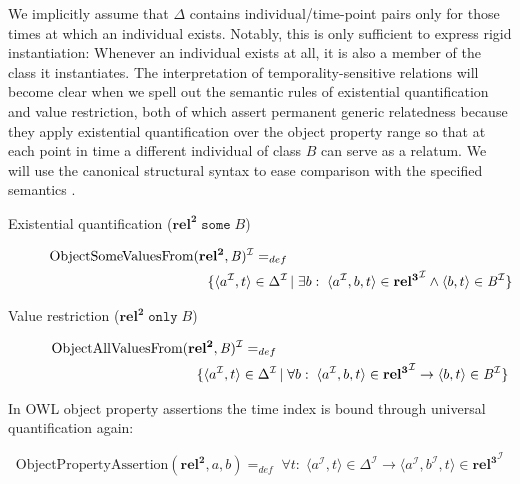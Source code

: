 \documentclass[10pt]{bmc_article}
\newcommand{\mirel}[1]{\ensuremath{\mathrm{\mathbf{#1}}}}
\newcommand{\mclass}[1]{\ensuremath{\mathit{#1}}}
\newcommand{\mrel}[2]{\mirel{#1^#2}}
\newcommand{\mrelb}[1]{\mrel{#1}{2}}
\newcommand{\mrelt}[1]{\mrel{#1}{3}}
\newcommand{\dlint}[1]{\ensuremath{#1^{\mathcal{I}}}}
\newcommand{\pair}[2]{\ensuremath{\langle #1,#2\rangle}}
\newenvironment{bmcformat}{\baselineskip20pt\sloppy\setboolean{publ}{false}}{\baselineskip20pt\sloppy}
\begin{document}
\begin{bmcformat}
We implicitly assume that $\Delta$ contains individual/time-point pairs only for
those times at which an individual exists. Notably, this is only sufficient to express rigid instantiation: Whenever an individual exists at
all, it is also a member of the class it instantiates. The interpretation of
temporality-sensitive relations will become clear when we spell out the semantic
rules of existential quantification and value restriction, both of which assert
permanent generic relatedness because they apply existential quantification over the
object property range so that at each point in time a different individual of
class \mclass{B} can serve as a relatum. We will use the canonical structural syntax
\cite{OWL2:structural}
to ease comparison with the specified semantics \cite{OWL2:direct}.

\begin{description}
\item[Existential quantification ($\mrelb{rel}\;\mathtt{some}\;\mclass{B}$)]
\begin{equation}
\begin{split}
\dlint{\text{ObjectSomeValuesFrom}&(\mrelb{rel},\mclass{B})} =_{def}\\ &\quad
\{\pair{\dlint{a}}{t}\in \dlint{\Delta}\,|\; \exists b:\;\langle\dlint{a},b,t\rangle
\in \dlint{\mrelt{rel}} \wedge \pair{b}{t} \in \dlint{\mclass{B}}\}
\end{split}
\end{equation} 
\item[Value restriction ($\mrelb{rel}\;\mathtt{only}\;\mclass{B}$)]
\begin{equation}
\begin{split}
\dlint{\text{ObjectAllValuesFrom}&(\mrelb{rel},\mclass{B})} =_{def}\\ &\quad
\{\pair{\dlint{a}}{t}\in \dlint{\Delta}\,|\; \forall b:\;\langle\dlint{a},b,t\rangle
\in \dlint{\mrelt{rel}} \rightarrow \pair{b}{t} \in \dlint{\mclass{B}}\}
\end{split}
\end{equation}
\end{description}

In OWL object property assertions the time index is bound through universal
quantification again:

\begin{equation}
\text{ObjectPropertyAssertion}(\mrelb{rel},a,b) =_{def}\;\forall
t:\;\pair{\dlint{a}}{t} \in \dlint{\Delta} \rightarrow \langle
\dlint{a},\dlint{b},t\rangle \in \dlint{\mrelt{rel}}
\end{equation}


\end{bmcformat}
\end{document}
